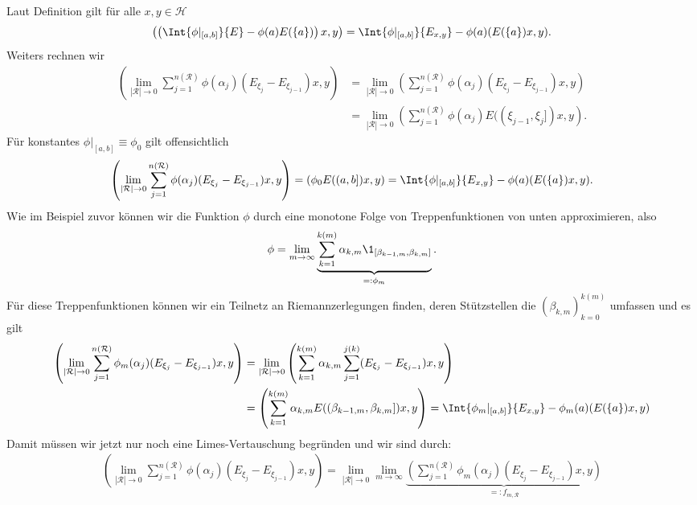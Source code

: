 \begin{solution}
Laut Definition gilt für alle $x,y \in \mathcal{H}$
\begin{align*}
  \left(\left(\Int{\phi|_{[a,b]}}{E} - \phi(a) E(\{a\})\right)x,y\right) =
  \Int{\phi|_{[a,b]}}{E_{x,y}} - \phi(a)(E(\{a\})x,y).
\end{align*}
Weiters rechnen wir
\begin{align*}
  \left(\lim_{|\mathcal{R}| \to 0}\sum_{j=1}^{n(\mathcal{R})}
  \phi(\alpha_j)(E_{\xi_j} - E_{\xi_{j-1}})x,y\right) &=
  \lim_{|\mathcal{R}| \to 0}
  \left(\sum_{j=1}^{n(\mathcal{R})}\phi(\alpha_j)(E_{\xi_j} - E_{\xi_{j-1}})x,y\right) \\
  &= \lim_{|\mathcal{R}| \to 0}
  \left(\sum_{j=1}^{n(\mathcal{R})}\phi(\alpha_j)E((\xi_{j-1},\xi_j])x,y\right).
\end{align*}
Für konstantes $\phi|_{[a,b]} \equiv \phi_0$ gilt offensichtlich
\begin{align*}
  \left(\lim_{|\mathcal{R}| \to 0}\sum_{j=1}^{n(\mathcal{R})}
  \phi(\alpha_j)(E_{\xi_j} - E_{\xi_{j-1}})x,y\right) =
  (\phi_0E((a,b])x,y) = \Int{\phi|_{[a,b]}}{E_{x,y}} - \phi(a)(E(\{a\})x,y).
\end{align*}
Wie im Beispiel zuvor können wir die Funktion $\phi$ durch eine monotone Folge
von Treppenfunktionen von unten approximieren, also
\begin{align*}
  \phi = \lim_{m \to \infty}\underbrace{\sum_{k=1}^{k(m)}\alpha_{k,m}
  \1_{[\beta_{k-1,m},\beta_{k,m}]}}_{=: \phi_m}.
\end{align*}
Für diese Treppenfunktionen können wir ein Teilnetz an Riemannzerlegungen
finden, deren Stützstellen die $(\beta_{k,m})_{k=0}^{k(m)}$ umfassen und
es gilt
\begin{align*}
  \left(\lim_{|\mathcal{R}| \to 0}\sum_{j=1}^{n(\mathcal{R})}
  \phi_m(\alpha_j)(E_{\xi_j} - E_{\xi_{j-1}})x,y\right) &=
  \lim_{|\mathcal{R}| \to 0}\left(\sum_{k=1}^{k(m)}
  \alpha_{k,m}\sum_{j=1}^{j(k)}(E_{\xi_j} - E_{\xi_{j-1}})x,y\right) \\
  &= \left(\sum_{k=1}^{k(m)}
  \alpha_{k,m}E((\beta_{k-1,m},\beta_{k,m}])x,y\right) =
  \Int{\phi_m|_{[a,b]}}{E_{x,y}} - \phi_m(a)(E(\{a\})x,y)
\end{align*}
Damit müssen wir jetzt nur noch eine Limes-Vertauschung begründen und wir sind durch:
\begin{align*}
  \left(\lim_{|\mathcal{R}| \to 0}\sum_{j=1}^{n(\mathcal{R})}
  \phi(\alpha_j)(E_{\xi_j} - E_{\xi_{j-1}})x,y\right) =
  \lim_{|\mathcal{R}| \to 0}\lim_{m \to \infty}
  \underbrace{\left(\sum_{j=1}^{n(\mathcal{R})}
  \phi_m(\alpha_j)(E_{\xi_j} - E_{\xi_{j-1}})x,y\right)}_{=: f_{m,\mathcal{R}}}

\end{align*}
\end{solution}
